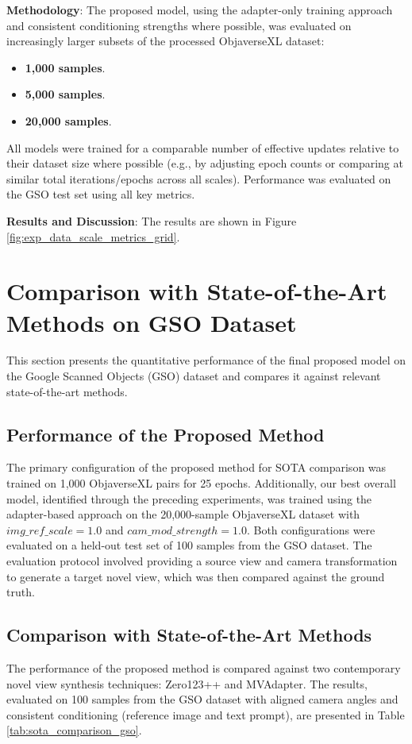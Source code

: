 \textbf{Methodology}:
The proposed model, using the adapter-only training approach and consistent conditioning strengths where possible, was evaluated on increasingly larger subsets of the processed ObjaverseXL dataset:
\begin{itemize}
  \item \textbf{1,000 samples}.
  \item \textbf{5,000 samples}.
  \item \textbf{20,000 samples}.
\end{itemize}
All models were trained for a comparable number of effective updates relative to their dataset size where possible (e.g., by adjusting epoch counts or comparing at similar total iterations/epochs across all scales). Performance was evaluated on the GSO test set using all key metrics.

\textbf{Results and Discussion}: The results are shown in Figure \ref{fig:exp_data_scale_metrics_grid}.

\section{Comparison with State-of-the-Art Methods on GSO Dataset}\label{sec:exp_gso_quantitative_sota}

This section presents the quantitative performance of the final proposed model on the Google Scanned Objects (GSO) dataset and compares it against relevant state-of-the-art methods.

\subsection{Performance of the Proposed Method}\label{ssec:exp_gso_our_model}
The primary configuration of the proposed method for SOTA comparison was trained on 1,000 ObjaverseXL pairs for 25 epochs. Additionally, our best overall model, identified through the preceding experiments, was trained using the adapter-based approach on the 20,000-sample ObjaverseXL dataset with $img\_ref\_scale=1.0$ and $cam\_mod\_strength=1.0$. Both configurations were evaluated on a held-out test set of 100 samples from the GSO dataset. The evaluation protocol involved providing a source view and camera transformation to generate a target novel view, which was then compared against the ground truth.

\subsection{Comparison with State-of-the-Art Methods}\label{ssec:exp_sota_comparison}
The performance of the proposed method is compared against two contemporary novel view synthesis techniques: Zero123++ and MVAdapter. The results, evaluated on 100 samples from the GSO dataset with aligned camera angles and consistent conditioning (reference image and text prompt), are presented in Table \ref{tab:sota_comparison_gso}.

